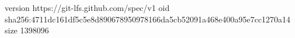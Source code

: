 version https://git-lfs.github.com/spec/v1
oid sha256:4711dc161df5c5e8d890678950978166da5cb52091a468e400a95e7cc1270a14
size 1398096
